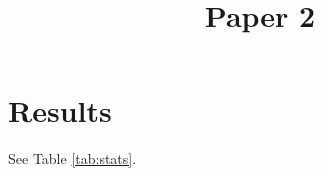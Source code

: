 \documentclass{ieeeaccess}
\begin{document}
\title{Paper 2}
\section{Results}
See Table \ref{tab:stats}.
\end{document}
